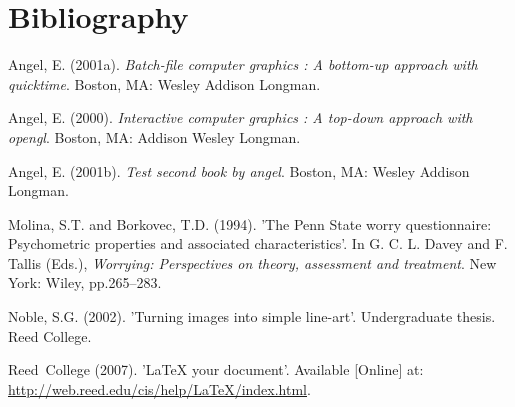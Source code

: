 \documentclass[12pt,phd,a4paper,twoside]{ucl_thesis}
\begin{document}
  \backmatter
  
  \hypertarget{bibliography}{%
  \chapter*{Bibliography}\label{bibliography}}
  
  \noindent
  
  \setlength{\parindent}{-0.20in}
  \setlength{\leftskip}{0.20in}
  \setlength{\parskip}{8pt}
  
  \hypertarget{refs}{}
  \leavevmode\hypertarget{ref-angel2001}{}%
  Angel, E. (2001a). \emph{Batch-file computer graphics : A bottom-up approach with quicktime}. Boston, MA: Wesley Addison Longman.
  
  \leavevmode\hypertarget{ref-angel2000}{}%
  Angel, E. (2000). \emph{Interactive computer graphics : A top-down approach with opengl}. Boston, MA: Addison Wesley Longman.
  
  \leavevmode\hypertarget{ref-angel2002a}{}%
  Angel, E. (2001b). \emph{Test second book by angel}. Boston, MA: Wesley Addison Longman.
  
  \leavevmode\hypertarget{ref-Molina1994}{}%
  Molina, S.T. and Borkovec, T.D. (1994). 'The Penn State worry questionnaire: Psychometric properties and associated characteristics'. In G. C. L. Davey and F. Tallis (Eds.), \emph{Worrying: Perspectives on theory, assessment and treatment}. New York: Wiley, pp.265--283.
  
  \leavevmode\hypertarget{ref-noble2002}{}%
  Noble, S.G. (2002). 'Turning images into simple line-art'. Undergraduate thesis. Reed College.
  
  \leavevmode\hypertarget{ref-reedweb2007}{}%
  Reed~College (2007). 'LaTeX your document'. Available {[}Online{]} at: \url{http://web.reed.edu/cis/help/LaTeX/index.html}.


\end{document}
